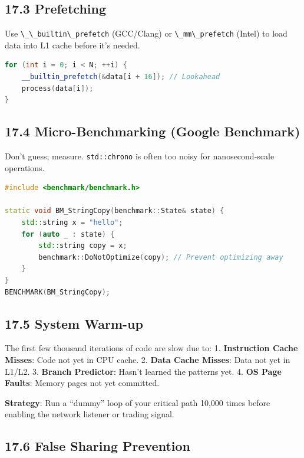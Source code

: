 \hypertarget{prefetching}{%
\subsection{17.3 Prefetching}\label{prefetching}}

Use \passthrough{\lstinline!\_\_builtin\_prefetch!} (GCC/Clang) or
\passthrough{\lstinline!\_mm\_prefetch!} (Intel) to load data into L1
cache before it's needed.

\begin{lstlisting}[language={C++}]
for (int i = 0; i < N; ++i) {
    __builtin_prefetch(&data[i + 16]); // Lookahead
    process(data[i]);
}
\end{lstlisting}

\hypertarget{micro-benchmarking-google-benchmark}{%
\subsection{17.4 Micro-Benchmarking (Google
Benchmark)}\label{micro-benchmarking-google-benchmark}}

Don't guess; measure. \passthrough{\lstinline!std::chrono!} is often too
noisy for nanosecond-scale operations.

\begin{lstlisting}[language={C++}]
#include <benchmark/benchmark.h>

static void BM_StringCopy(benchmark::State& state) {
    std::string x = "hello";
    for (auto _ : state) {
        std::string copy = x;
        benchmark::DoNotOptimize(copy); // Prevent optimizing away
    }
}
BENCHMARK(BM_StringCopy);
\end{lstlisting}

\hypertarget{system-warm-up}{%
\subsection{17.5 System Warm-up}\label{system-warm-up}}

The first few thousand iterations of code are slow due to: 1.
\textbf{Instruction Cache Misses}: Code not yet in CPU cache. 2.
\textbf{Data Cache Misses}: Data not yet in L1/L2. 3. \textbf{Branch
Predictor}: Hasn't learned the patterns yet. 4. \textbf{OS Page Faults}:
Memory pages not yet committed.

\textbf{Strategy}: Run a ``dummy'' loop of your critical path 10,000
times before enabling the network listener or trading signal.

\hypertarget{false-sharing-prevention}{%
\subsection{17.6 False Sharing
Prevention}\label{false-sharing-prevention}}

